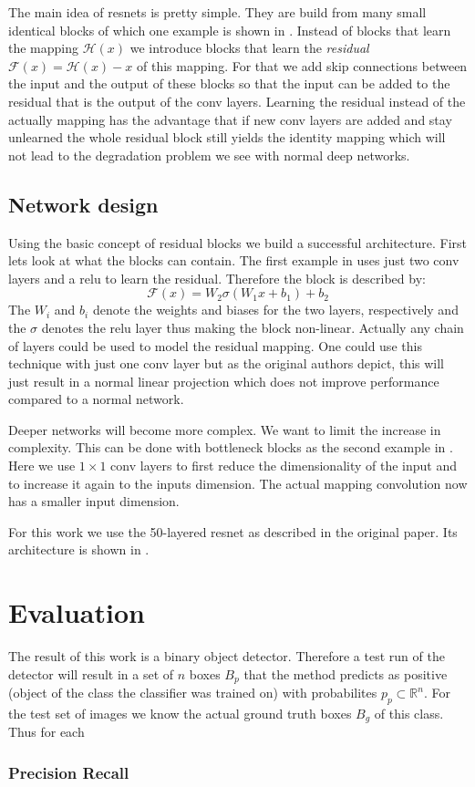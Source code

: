 The main idea of \glspl{resnet} is pretty simple. They are build from many small identical blocks of which one example is shown in . Instead of blocks that learn the mapping $\mathcal{H}(x)$ we introduce blocks that learn the \textit{residual} $\mathcal{F}(x) = \mathcal{H}(x) - x$ of this mapping. For that we add skip connections between the input and the output of these blocks so that the input can be added to the residual that is the output of the \gls{conv} layers. Learning the residual instead of the actually mapping has the advantage that if new \gls{conv} layers are added and stay unlearned the whole residual block still yields the identity mapping which will not lead to the degradation problem we see with normal deep networks.

\subsection{Network design}
\label{sec:concepts:resnet:design}
Using the basic concept of residual blocks we build a successful architecture. First lets look at what the blocks can contain. The first example in  uses just two \gls{conv} layers and a \gls{relu} to learn the residual. Therefore the block is described by:
\begin{equation}
    \mathcal{F}(x) = W_2\sigma(W_1 x + b_1) + b_2
\end{equation}
The $W_i$ and $b_i$ denote the weights and biases for the two layers, respectively and the $\sigma$ denotes the \gls{relu} layer thus making the block non-linear. Actually any chain of layers could be used to model the residual mapping. One could use this technique with just one \gls{conv} layer but as the original authors \citep{he_deep_2016} depict, this will just result in a normal linear projection which does not improve performance compared to a normal network.

Deeper networks will become more complex. We want to limit the increase in complexity. This can be done with bottleneck blocks as the second example in . Here we use $1\times1$ \gls{conv} layers to first reduce the dimensionality of the input and to increase it again to the inputs dimension. The actual mapping convolution now has a smaller input dimension.

For this work we use the 50-layered \gls{resnet} as described in the original paper. Its architecture is shown in .

\section{Evaluation}
\label{sec:concepts:eval}
The result of this work is a binary object detector. Therefore a test run of the detector will result in a set of $n$ boxes $B_p$ that the method predicts as positive (object of the class the classifier was trained on) with probabilites $p_p \subset \mathbb{R}^n$. For the test set of images we know the actual ground truth boxes $B_g$ of this class. Thus for each
\subsubsection{Precision Recall}
